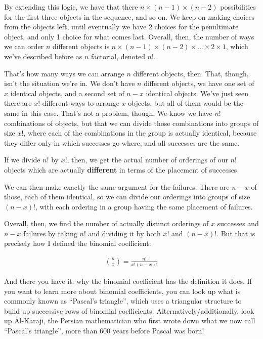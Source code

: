 \documentclass[11pt,a4paper]{article}
\begin{document}
By extending this logic, we have that there $n\times (n-1) \times (n-2)$ possibilities for the first three objects in the sequence, and so on. We keep on making choices from the objects left, until eventually we have 2 choices for the penultimate object, and only 1 choice for what comes last. Overall, then, the number of ways we can order $n$ different objects is $n\times(n-1)\times(n-2)\times\ldots\times2\times1$, which we've described before as $n$ factorial, denoted $n!$.
\vspace{0.1cm}

That's how many ways we can arrange $n$ different objects, then. That, though, isn't the situation we're in. We don't have $n$ different objects, we have one set of $x$ identical objects, and a second set of $n-x$ identical objects. We've just seen there are $x!$ different ways to arrange $x$ objects, but all of them would be the same in this case. That's not a problem, though. We know we have $n!$ combinations of objects, but that we can divide those combinations into groups of size $x!$, where each of the combinations in the group is actually identical, because they differ only in which successes go where, and all successes are the same.
\vspace{0.1cm}

If we divide $n!$ by $x!$, then, we get the actual number of orderings of our $n!$ objects which are actually \textbf{different} in terms of the placement of successes.

\vspace{0.1cm}

We can then make exactly the same argument for the failures. There are $n-x$ of those, each of them identical, so we can divide our orderings into groups of size $(n-x)!$, with each ordering in a group having the same placement of failures.
\vspace{0.1cm}

Overall, then, we find the number of actually distinct orderings of $x$ successes and $n-x$ failures by taking $n!$ and dividing it by both $x!$ and $(n-x)!$. But that is precisely how I defined the binomial coefficient:

\begin{eqnarray*}
{n\choose x}=\frac{n!}{x!(n-x)!}
\end{eqnarray*}

And there you have it: why the binomial coefficient has the definition it does. If you want to learn more about binomial coefficients, you can look up what is commonly known as ``Pascal's triangle'', which uses a triangular structure to build up successive rows of binomial coefficients. Alternatively/additionally, look up Al-Karaji, the Persian mathematician who first wrote down what we now call ``Pascal's triangle'', more than 600 years before Pascal was born!
\end{document}
